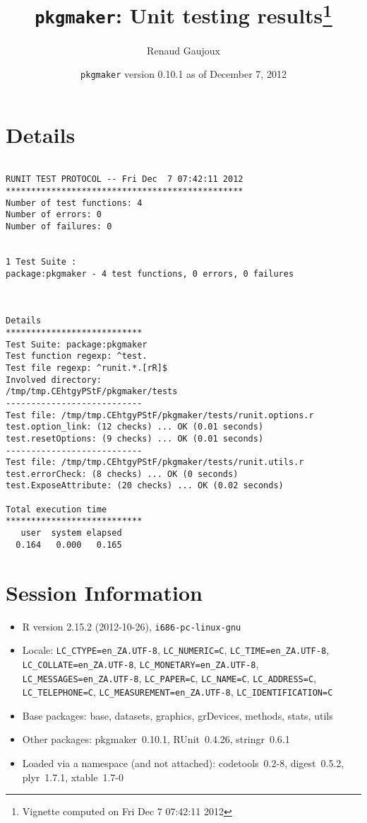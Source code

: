 \documentclass[10pt]{article}
\author{Renaud Gaujoux}
\title{\texttt{pkgmaker}: Unit testing results\footnote{Vignette computed  on Fri Dec  7 07:42:11 2012}}
\date{\texttt{pkgmaker} version 0.10.1 as of December  7, 2012}
\begin{document}
\maketitle

\section{Details}
\begin{verbatim}

RUNIT TEST PROTOCOL -- Fri Dec  7 07:42:11 2012 
*********************************************** 
Number of test functions: 4 
Number of errors: 0 
Number of failures: 0 

 
1 Test Suite : 
package:pkgmaker - 4 test functions, 0 errors, 0 failures



Details 
*************************** 
Test Suite: package:pkgmaker 
Test function regexp: ^test. 
Test file regexp: ^runit.*.[rR]$ 
Involved directory: 
/tmp/tmp.CEhtgyPStF/pkgmaker/tests 
--------------------------- 
Test file: /tmp/tmp.CEhtgyPStF/pkgmaker/tests/runit.options.r 
test.option_link: (12 checks) ... OK (0.01 seconds)
test.resetOptions: (9 checks) ... OK (0.01 seconds)
--------------------------- 
Test file: /tmp/tmp.CEhtgyPStF/pkgmaker/tests/runit.utils.r 
test.errorCheck: (8 checks) ... OK (0 seconds)
test.ExposeAttribute: (20 checks) ... OK (0.02 seconds)

Total execution time
***************************
   user  system elapsed 
  0.164   0.000   0.165 

\end{verbatim}

\section*{Session Information}
\begin{itemize}\raggedright
  \item R version 2.15.2 (2012-10-26), \verb|i686-pc-linux-gnu|
  \item Locale: \verb|LC_CTYPE=en_ZA.UTF-8|, \verb|LC_NUMERIC=C|, \verb|LC_TIME=en_ZA.UTF-8|, \verb|LC_COLLATE=en_ZA.UTF-8|, \verb|LC_MONETARY=en_ZA.UTF-8|, \verb|LC_MESSAGES=en_ZA.UTF-8|, \verb|LC_PAPER=C|, \verb|LC_NAME=C|, \verb|LC_ADDRESS=C|, \verb|LC_TELEPHONE=C|, \verb|LC_MEASUREMENT=en_ZA.UTF-8|, \verb|LC_IDENTIFICATION=C|
  \item Base packages: base, datasets, graphics, grDevices, methods,
    stats, utils
  \item Other packages: pkgmaker~0.10.1, RUnit~0.4.26, stringr~0.6.1
  \item Loaded via a namespace (and not attached): codetools~0.2-8,
    digest~0.5.2, plyr~1.7.1, xtable~1.7-0
\end{itemize}
\end{document}
